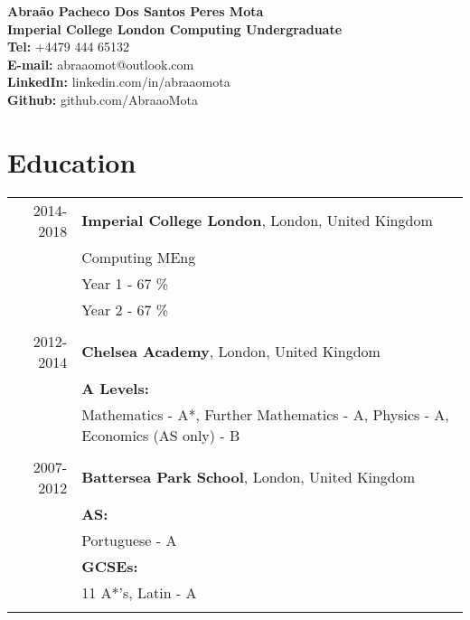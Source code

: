 \documentclass[a4paper,10pt]{article}
\begin{document}
	
	\begin{center}
		{\LARGE\bfseries Abra\~ao Pacheco Dos Santos Peres Mota} \\
		\vspace{2mm}
		{\large \textbf{Imperial College London Computing Undergraduate} } \vspace{1mm} \\
		{\large \textbf{Tel:} +4479 444 65132} \\ \vspace{1mm}
		{\large \textbf{E-mail:} abraaomot@outlook.com } \\ \vspace{1mm}
		{\large \textbf{LinkedIn:} linkedin.com/in/abraaomota } \\ \vspace{1mm}
		{\large \textbf{Github:} github.com/AbraaoMota } \\
	
	\end{center}
	
	\section*{Education}
	
	\begin{tabular}{rl}	
		2014-2018 & \textbf{Imperial College London}, London, United Kingdom \\& 
		Computing MEng\\&
		Year 1 - 67 \% \\&
		Year 2 - 67 \% 
	 	
		 \\\multicolumn{2}{c}{} \\
		
		2012-2014 & \textbf{Chelsea Academy}, London, United Kingdom \\&
		\textbf{A Levels:} \\&
		Mathematics - A*, Further Mathematics - A, Physics - A, Economics (AS only) - B 
		\\\multicolumn{2}{c}{} \\
		
		2007-2012 & \textbf{Battersea Park School}, London, United Kingdom \\& 
		\textbf{AS:} \\&
		Portuguese - A \\&
		\textbf{GCSEs:} \\&
		11 A*'s, Latin - A
		\\\multicolumn{2}{c}{} \\
	
	\end{tabular}
	
\end{document}
